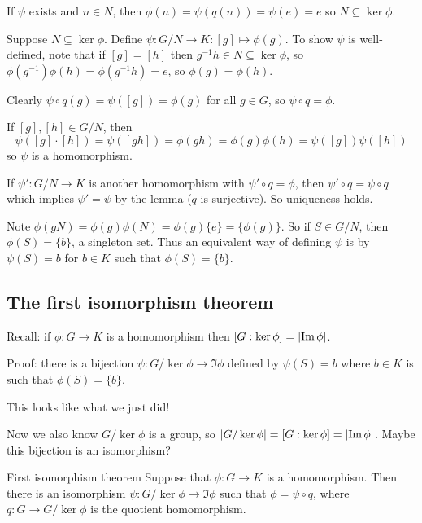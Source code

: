 \documentclass[12pt,letterpaper]{report}
\begin{document}
\begin{thmproof}
  If $\psi$ exists and $n \in N$, then $\phi(n) = \psi(q(n)) = \psi(e) = e$ so
  $N \subseteq \ker\phi$.

  Suppose $N \subseteq \ker\phi$.
  Define $\psi \colon G/N \to K : [g] \mapsto \phi(g)$.
  To show $\psi$ is well-defined, note that if $[g] = [h]$ then $g^{-1}h \in N \subseteq \ker\phi$,
  so $\phi(g^{-1})\phi(h) = \phi(g^{-1}h) = e$, so $\phi(g) = \phi(h)$.

  Clearly $\psi \circ q(g) = \psi([g]) = \phi(g)$ for all $g \in G$, so $\psi \circ q = \phi$.

  If $[g], [h] \in G/N$, then
  \[
    \psi([g] \cdot [h]) = \psi([gh]) = \phi(gh) = \phi(g)\phi(h) = \psi([g])\psi([h])
  \]
  so $\psi$ is a homomorphism.

  If $\psi' \colon G/N \to K$ is another homomorphism with $\psi' \circ q = \phi$, then
  $\psi' \circ q = \psi \circ q$ which implies $\psi' = \psi$ by the lemma ($q$ is surjective).
  So uniqueness holds.
\end{thmproof}

Note $\phi(gN) = \phi(g)\phi(N) = \phi(g)\{e\} = \{\phi(g)\}$.
So if $S \in G/N$, then $\phi(S) = \{b\}$, a singleton set.
Thus an equivalent way of defining $\psi$ is by $\psi(S) = b$ for $b \in K$ such that
$\phi(S) = \{b\}$.

\pagebreak
\subsection{The first isomorphism theorem}

Recall: if $\phi \colon G \to K$ is a homomorphism then $[G : \ker\phi] = \lvert\operatorname{Im}\phi\rvert$.

Proof: there is a bijection $\psi \colon G/\ker\phi \to \Im\phi$ defined by $\psi(S) = b$ where
$b \in K$ is such that $\phi(S) = \{b\}$.

This looks like what we just did!

Now we also know $G/\ker\phi$ is a group, so $\lvert G/\ker\phi\rvert = [G : \ker\phi] = \lvert\operatorname{Im}\phi\rvert$.
Maybe this bijection is an isomorphism?

\begin{thm}{First isomorphism theorem}{}
  Suppose that $\phi \colon G \to K$ is a homomorphism.
  Then there is an isomorphism $\psi \colon G/\ker\phi \to \Im\phi$ such that $\phi = \psi \circ q$,
  where $q \colon G \to G/\ker\phi$ is the quotient homomorphism.
\end{thm}
\end{document}

